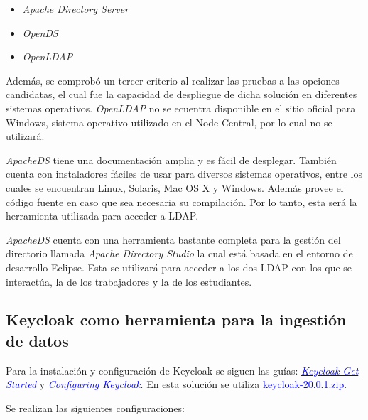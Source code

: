 \begin{itemize}
	\item \textit{Apache Directory Server}
	\item \textit{OpenDS}
	\item \textit{OpenLDAP}
\end{itemize}

Además, se comprobó un tercer criterio al realizar las pruebas a las opciones candidatas, el cual fue la capacidad de despliegue de dicha solución en diferentes sistemas operativos. \textit{OpenLDAP} no se ecuentra disponible en el sitio oficial para Windows, sistema operativo utilizado en el Node Central, por lo cual no se utilizará. 

\textit{ApacheDS} tiene una documentación amplia y es fácil de desplegar. También cuenta con instaladores fáciles de usar para diversos sistemas operativos, entre los cuales se encuentran Linux, Solaris, Mac OS X y Windows. Además provee el código fuente en caso que sea necesaria su compilación. Por lo tanto, esta será la herramienta utilizada para acceder a LDAP.

\textit{ApacheDS} cuenta con una herramienta bastante completa para la gestión del directorio llamada \textit{Apache Directory Studio} la cual está basada en el entorno de desarrollo Eclipse. Esta se utilizará para acceder a los dos LDAP con los que se interactúa, la de los trabajadores y la de los estudiantes.

\subsection*{Keycloak como herramienta para la ingestión de datos}
%

Para la instalación y configuración de Keycloak se siguen las guías: \href{https://www.keycloak.org/getting-started/getting-started-zip}{\textcolor{blue}{\textit{Keycloak Get Started}}} y \href{https://www.keycloak.org/server/configuration}{\textit{\textcolor{blue}{Configuring Keycloak}}}. En esta solución se utiliza \href{https://github.com/keycloak/keycloak/releases/download/20.0.1/keycloak-20.0.1.zip}{\textcolor{blue}{keycloak-20.0.1.zip}}.

Se realizan las siguientes configuraciones:


